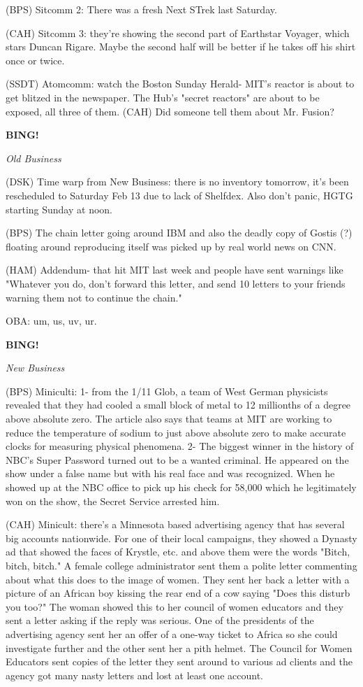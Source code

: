 \documentclass[12pt]{article}
\newcommand{\bing}{{\bf BING!} }
\newcommand{\goto}[1]{\bing \vskip 12pt \centerline{{\em{#1}}}}
\begin{document}
(BPS) Sitcomm 2: There was a fresh Next STrek last Saturday.

(CAH) Sitcomm 3: they're showing the second part of Earthstar Voyager, which stars Duncan Rigare. Maybe the second half will be better if he takes off his shirt once or twice.

(SSDT) Atomcomm: watch the Boston Sunday Herald- MIT's reactor is about to get blitzed in the newspaper. The Hub's "secret reactors" are about to be exposed, all three of them. (CAH) Did someone tell them about Mr. Fusion?

\goto{Old Business}

(DSK) Time warp from New Business: there is no inventory tomorrow, it's been rescheduled to Saturday Feb 13 due to lack of Shelfdex. Also don't panic, HGTG starting Sunday at noon.

(BPS) The chain letter going around IBM and also the deadly copy of Gostis (?) floating around reproducing itself was picked up by real world news on CNN.

(HAM) Addendum- that hit MIT last week and people have sent warnings like "Whatever you do, don't forward this letter, and send 10 letters to your friends warning them not to continue the chain."

OBA: um, us, uv, ur.

\goto{New Business}

(BPS) Miniculti: 1- from the 1/11 Glob, a team of West German physicists revealed that they had cooled a small block of metal to 12 millionths of a degree above absolute zero. The article also says that teams at MIT are working to reduce the temperature of sodium to just above absolute zero to make accurate clocks for measuring physical phenomena. 2- The biggest winner in the history of NBC's Super Password turned out to be a wanted criminal. He appeared on the show under a false name but with his real face and was recognized. When he showed up at the NBC office to pick up his check for 58,000 which he legitimately won on the show, the Secret Service arrested him.

(CAH) Minicult: there's a Minnesota based advertising agency that has several big accounts nationwide. For one of their local campaigns, they showed a Dynasty ad that showed the faces of Krystle, etc. and above them were the words "Bitch, bitch, bitch." A female college administrator sent them a polite letter commenting about what this does to the image of women. They sent her back a letter with a picture of an African boy kissing the rear end of a cow saying "Does this disturb you too?" The woman showed this to her council of women educators and they sent a letter asking if the reply was serious. One of the presidents of the advertising agency sent her an offer of a one-way ticket to Africa so she could investigate further and the other sent her a pith helmet. The Council for Women Educators sent copies of the letter they sent around to various ad clients and the agency got many nasty letters and lost at least one account.
\end{document}
